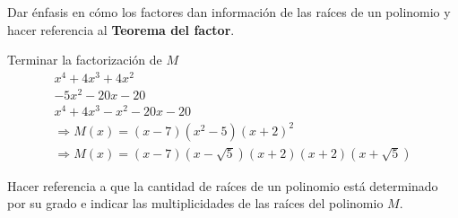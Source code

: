 \documentclass[12pt]{article}
\begin{document}
{        Dar énfasis en cómo los factores dan información de las raíces de un polinomio y hacer referencia al \textbf{Teorema del factor}.

        Terminar la factorización de $M$
        \begin{align*}
            x^4 + 4x^3 + 4x^2\hspace{5em}\\
            -5x^2 - 20x - 20\\
            x^4 + 4x^3 - x^2 - 20x - 20\\
            \Rightarrow M(x) = (x - 7)(x^2 - 5)(x + 2)^2\\
            \Rightarrow M(x) = (x - 7)(x - \sqrt{5})(x + 2)(x + 2)(x + \sqrt{5})
        \end{align*}

        Hacer referencia a que la cantidad de raíces de un polinomio está determinado por su grado e indicar las multiplicidades de las raíces del polinomio $M$.
    }\label{sec:clase-02}
\end{document}
